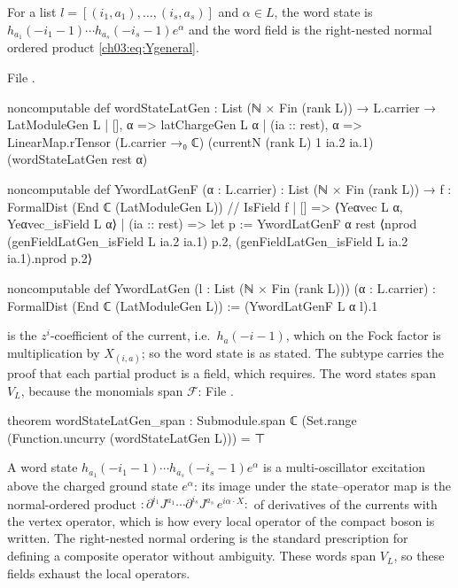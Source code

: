 \begin{definition}\label{ch03:def:words}
For a list $l=[(i_1,a_1),\dots,(i_s,a_s)]$ and $\alpha\in L$, the word state is
$h_{a_1}(-i_1-1)\cdots h_{a_s}(-i_s-1)e^\alpha$ and the word field is the right-nested normal
ordered product \eqref{ch03:eq:Ygeneral}.
\end{definition}
\noindent File .
\begin{leancode}
noncomputable def wordStateLatGen : List (ℕ × Fin (rank L)) → L.carrier → LatModuleGen L
  | [], α => latChargeGen L α
  | (ia :: rest), α =>
      LinearMap.rTensor (L.carrier →₀ ℂ) (currentN (rank L) 1 ia.2 ia.1) (wordStateLatGen rest α)

noncomputable def YwordLatGenF (α : L.carrier) :
    List (ℕ × Fin (rank L)) → { f : FormalDist (End ℂ (LatModuleGen L)) // IsField f }
  | [] => ⟨Yeαvec L α, Yeαvec_isField L α⟩
  | (ia :: rest) =>
      let p := YwordLatGenF α rest
      ⟨nprod (genFieldLatGen_isField L ia.2 ia.1) p.2,
        (genFieldLatGen_isField L ia.2 ia.1).nprod p.2⟩

noncomputable def YwordLatGen (l : List (ℕ × Fin (rank L))) (α : L.carrier) :
    FormalDist (End ℂ (LatModuleGen L)) := (YwordLatGenF L α l).1
\end{leancode}

\begin{dictionary}
 is the $z^i$-coefficient of the current, i.e.\ $h_a(-i-1)$, which
on the Fock factor is multiplication by $X_{(i,a)}$; so the word state is as stated. The subtype
 carries the proof that each partial product is a field, which
 requires. The word states span $V_L$, because the
monomials span $\mathcal F$:
\noindent File .
\begin{leancode}
theorem wordStateLatGen_span :
    Submodule.span ℂ (Set.range (Function.uncurry (wordStateLatGen L))) = ⊤
\end{leancode}
\end{dictionary}

\begin{physics}
A word state $h_{a_1}(-i_1-1)\cdots h_{a_s}(-i_s-1)e^\alpha$ is a multi-oscillator excitation above the charged ground state $e^\alpha$: its image under the state--operator map is the normal-ordered product $:\!\partial^{i_1}J^{a_1}\cdots\partial^{i_s}J^{a_s}\,e^{i\alpha\cdot X}\!:$ of derivatives of the currents with the vertex operator, which is how every local operator of the compact boson is written. The right-nested normal ordering is the standard prescription for defining a composite operator without ambiguity. These words span $V_L$, so these fields exhaust the local operators.
\end{physics}

